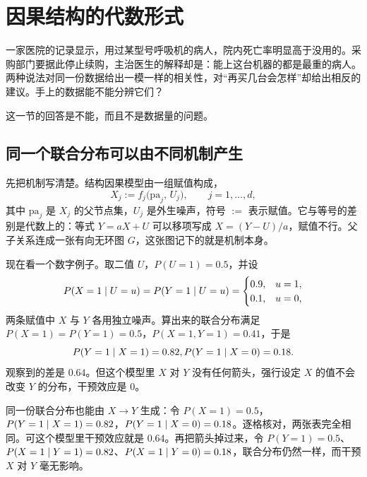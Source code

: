 \section{因果结构的代数形式}
\label{sec:12-Real-Analysis-Support/10-Essential-Structures/04}

一家医院的记录显示，用过某型号呼吸机的病人，院内死亡率明显高于没用的。采购部门要据此停止续购，主治医生的解释却是：能上这台机器的都是最重的病人。两种说法对同一份数据给出一模一样的相关性，对``再买几台会怎样''却给出相反的建议。手上的数据能不能分辨它们？

这一节的回答是不能，而且不是数据量的问题。

\subsection{同一个联合分布可以由不同机制产生}

先把机制写清楚。结构因果模型由一组赋值构成，
\[
X_j := f_j\big(\mathrm{pa}_j,\,U_j\big),\qquad j=1,\dots,d,
\]
其中 \(\mathrm{pa}_j\) 是 \(X_j\) 的父节点集，\(U_j\) 是外生噪声，符号 \(:=\) 表示赋值。它与等号的差别是代数上的：等式 \(Y=aX+U\) 可以移项写成 \(X=(Y-U)/a\)，赋值不行。父子关系连成一张有向无环图 \(G\)，这张图记下的就是机制本身。

现在看一个数字例子。取二值 \(U\)，\(P(U=1)=0.5\)，并设
\[
P(X=1\mid U=u)=P(Y=1\mid U=u)=
\begin{cases}0.9,&u=1,\\ 0.1,&u=0,\end{cases}
\]
两条赋值中 \(X\) 与 \(Y\) 各用独立噪声。算出来的联合分布满足 \(P(X=1)=P(Y=1)=0.5\)，\(P(X=1,Y=1)=0.41\)，于是
\[
P(Y=1\mid X=1)=0.82,\space P(Y=1\mid X=0)=0.18 .
\]
观察到的差是 \(0.64\)。但这个模型里 \(X\) 对 \(Y\) 没有任何箭头，强行设定 \(X\) 的值不会改变 \(Y\) 的分布，干预效应是 \(0\)。

同一份联合分布也能由 \(X\to Y\) 生成：令 \(P(X=1)=0.5\)，\(P(Y=1\mid X=1)=0.82\)，\(P(Y=1\mid X=0)=0.18\)。逐格核对，两张表完全相同。可这个模型里干预效应就是 \(0.64\)。再把箭头掉过来，令 \(P(Y=1)=0.5\)、\(P(X=1\mid Y=1)=0.82\)、\(P(X=1\mid Y=0)=0.18\)，联合分布仍然一样，而干预 \(X\) 对 \(Y\) 毫无影响。

